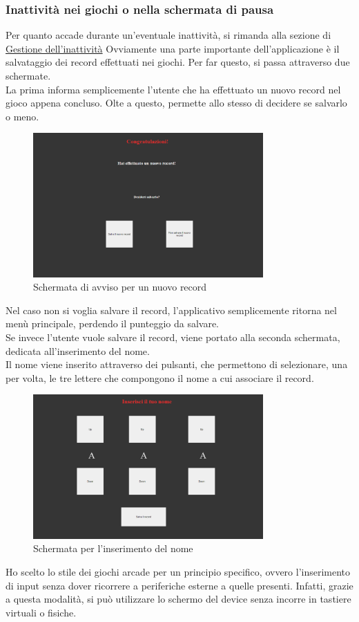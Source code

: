 \subsubsection{Inattività nei giochi o nella schermata di pausa}
Per quanto accade durante un'eventuale inattività, si rimanda alla sezione di \hyperref[sec:inactivity]{Gestione dell'inattività}
\newpage
Ovviamente una parte importante dell'applicazione è il salvataggio dei record effettuati nei giochi. Per far questo, si passa attraverso due schermate.\\
La prima informa semplicemente l'utente che ha effettuato un nuovo record nel gioco appena concluso. Olte a questo, permette allo stesso di decidere se salvarlo o meno.\\
\begin{figure}[h]
    \centering
    \includegraphics[width=250pt]{images/product/schermataNuovoRecord.png}
    \caption{Schermata di avviso per un nuovo record}
    \label{fig:schermataNuovoRecord}
\end{figure}
Nel caso non si voglia salvare il record, l'applicativo semplicemente ritorna nel menù principale, perdendo il punteggio da salvare.\\
Se invece l'utente vuole salvare il record, viene portato alla seconda schermata, dedicata all'inserimento del nome.\\
Il nome viene inserito attraverso dei pulsanti, che permettono di selezionare, una per volta, le tre lettere che compongono il nome a cui associare il record.
\begin{figure}[h]
    \centering
    \includegraphics[width=250pt]{images/product/schermataInserimentoNome.png}
    \caption{Schermata per l'inserimento del nome}
    \label{fig:schermataInserimentoNome}
\end{figure}
Ho scelto lo stile dei giochi arcade per un principio specifico, ovvero l'inserimento di input senza dover ricorrere a periferiche esterne a quelle presenti. Infatti, grazie a questa modalità, si può utilizzare lo schermo del device senza incorre in tastiere virtuali o fisiche.

